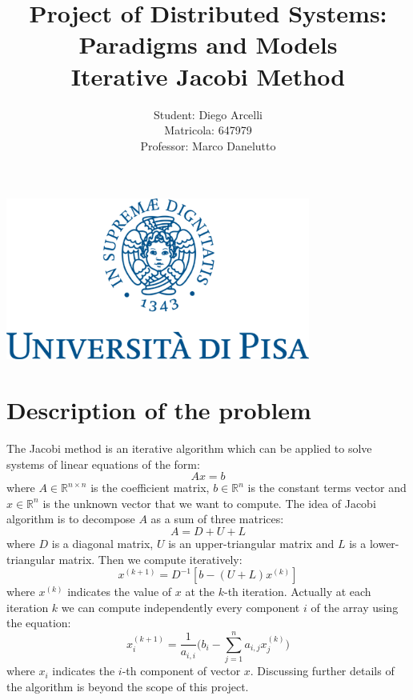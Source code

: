 \documentclass[12pt]{article}
\begin{document}
	
	\begin{titlepage}
		
		\title{Project of Distributed Systems: Paradigms and Models \\
		Iterative Jacobi Method}
		\author{Student: Diego Arcelli\\ Matricola: 647979 \\
			Professor: Marco  Danelutto}
		\maketitle
		\centering
		\includegraphics[width=10cm]{./images/unipi_logo.png}
		
	\end{titlepage}
	
	\tableofcontents
	\newpage
	
	\section{Description of the problem}
	The Jacobi method is an iterative algorithm which can be applied to solve systems of linear equations of the form:
	\[ Ax = b\]
	where $A \in \mathbb{R}^{n\times n}$ is the coefficient matrix, $b \in \mathbb{R}^n$ is the constant terms vector and $x\in \mathbb{R}^n$ is the unknown vector that we want to compute. The idea of Jacobi algorithm is to decompose $A$ as a sum of three matrices:
	\[ A = D + U + L\]
	where $D$ is a diagonal matrix, $U$ is an upper-triangular matrix and $L$ is a lower-triangular matrix. Then we compute iteratively:
	\[ x^{(k+1)} =  D^{-1}[b-(U+L)x^{(k)}] \]
	where $x^{(k)}$ indicates the value of $x$ at the $k$-th iteration. Actually at each iteration $k$ we can compute independently every component $i$ of the array using the equation:
	\begin{equation}
		\label{eqn:iteration}
		x^{(k+1)}_i = \frac{1}{a_{i,i}}\Big(b_i - \sum_{j=1}^n a_{i,j}x^{(k)}_j\Big)
	\end{equation}
	where $x_i$ indicates the $i$-th component of vector $x$. Discussing further details of the algorithm is beyond the scope of this project.
	
\end{document}
